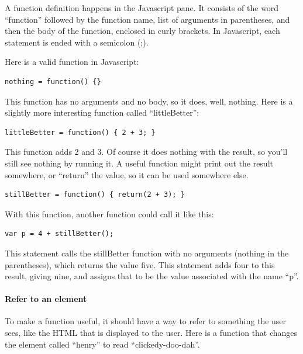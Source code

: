 \documentclass[11pt]{article}
\begin{document}
A function definition happens in the Javascript pane.  It consists of
the word ``function'' followed by the function name, list of arguments
in parentheses, and then the body of the function, enclosed in curly
brackets.  In Javascript, each statement is ended with a semicolon
(;).

Here is a valid function in Javascript:

\begin{verbatim}
nothing = function() {}
\end{verbatim}

This function has no arguments and no body, so it does, well, nothing.
Here is a slightly more interesting function called ``littleBetter'':

\begin{verbatim}
littleBetter = function() { 2 + 3; }
\end{verbatim}

This function adds 2 and 3.  Of course it does nothing with the
result, so you'll still see nothing by running it.  A useful function
might print out the result somewhere, or ``return'' the value, so it
can be used somewhere else.

\begin{verbatim}
stillBetter = function() { return(2 + 3); }
\end{verbatim}

With this function, another function could call it like this:

\begin{verbatim}
var p = 4 + stillBetter();
\end{verbatim}

This statement calls the stillBetter function with no arguments
(nothing in the parentheses), which returns the value five.  This
statement adds four to this result, giving nine, and assigns that to be
the value associated with the name ``p''.


\paragraph{Refer to an element}

To make a function useful, it should have a way to refer to something
the user sees, like the HTML that is displayed to the user.  Here is a
function that changes the element called ``henry'' to read
``clickedy-doo-dah''.
\end{document}
